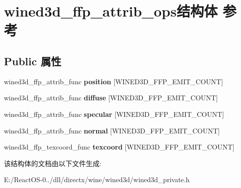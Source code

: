 \hypertarget{structwined3d__ffp__attrib__ops}{}\section{wined3d\+\_\+ffp\+\_\+attrib\+\_\+ops结构体 参考}
\label{structwined3d__ffp__attrib__ops}
\subsection*{Public 属性}
\begin{DoxyCompactItemize}
\item 
\mbox{\label{structwined3d__ffp__attrib__ops_a53c2e1cc8286b9549f7ec268e27c5d08}} 
wined3d\+\_\+ffp\+\_\+attrib\+\_\+func {\bfseries position} \mbox{[}W\+I\+N\+E\+D3\+D\+\_\+\+F\+F\+P\+\_\+\+E\+M\+I\+T\+\_\+\+C\+O\+U\+NT\mbox{]}
\item 
\mbox{\label{structwined3d__ffp__attrib__ops_afbcbd22c5b0f1dbaa1897957c064ee64}} 
wined3d\+\_\+ffp\+\_\+attrib\+\_\+func {\bfseries diffuse} \mbox{[}W\+I\+N\+E\+D3\+D\+\_\+\+F\+F\+P\+\_\+\+E\+M\+I\+T\+\_\+\+C\+O\+U\+NT\mbox{]}
\item 
\mbox{\label{structwined3d__ffp__attrib__ops_aaa6cfe5189ef0c5177aaa8aa7c045b4a}} 
wined3d\+\_\+ffp\+\_\+attrib\+\_\+func {\bfseries specular} \mbox{[}W\+I\+N\+E\+D3\+D\+\_\+\+F\+F\+P\+\_\+\+E\+M\+I\+T\+\_\+\+C\+O\+U\+NT\mbox{]}
\item 
\mbox{\label{structwined3d__ffp__attrib__ops_a660a0a25800ee7210d377c7e5ec402ff}} 
wined3d\+\_\+ffp\+\_\+attrib\+\_\+func {\bfseries normal} \mbox{[}W\+I\+N\+E\+D3\+D\+\_\+\+F\+F\+P\+\_\+\+E\+M\+I\+T\+\_\+\+C\+O\+U\+NT\mbox{]}
\item 
\mbox{\label{structwined3d__ffp__attrib__ops_a1ba870d983cf408dfbb51f3cf97e2edc}} 
wined3d\+\_\+ffp\+\_\+texcoord\+\_\+func {\bfseries texcoord} \mbox{[}W\+I\+N\+E\+D3\+D\+\_\+\+F\+F\+P\+\_\+\+E\+M\+I\+T\+\_\+\+C\+O\+U\+NT\mbox{]}
\end{DoxyCompactItemize}


该结构体的文档由以下文件生成\+:\begin{DoxyCompactItemize}
\item 
E\+:/\+React\+O\+S-\/0../dll/directx/wine/wined3d/wined3d\+\_\+private.\+h\end{DoxyCompactItemize}

